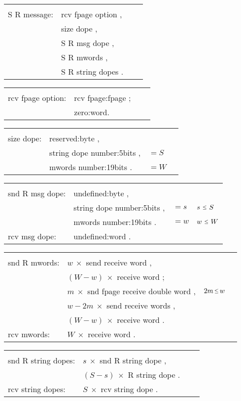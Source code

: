 \documentclass[a4paper,11pt,twoside,dvips]{book}
\newcommand{\smaller}[1]{{\mathchoice 
           {\raisebox{1pt}{$\scriptstyle #1$}} 
           {\raisebox{1pt}{$\scriptstyle #1$}} 
           {\raisebox{0.5pt}{$\scriptscriptstyle #1$}} 
           {\raisebox{0.5pt}{$\scriptscriptstyle #1$}} 
}}
\newcommand{\LE}{\smaller{\le}}
\newlength{\Up}\setlength{\Up}{-\baselineskip}
\newenvironment{vwg}{\par\vspace{10pt}%
\noindent\begin{tabular}{llll}\hspace*{80pt}&\hspace*{200pt}\\[\Up]} 
{\end{tabular}\par\vspace{10pt}}
\begin{document}
\begin{vwg} 
S R message: & rcv fpage option ,\\ 
             & size dope ,\\ 
             & S R msg dope ,\\ 
             & S R mwords ,\\ 
             & S R string dopes . 
\end{vwg} 
 
 
\begin{vwg} 
rcv fpage option: & rcv fpage:fpage ;\\ 
                  & zero:word. 
\end{vwg} 
 
 
 
\begin{vwg} 
size dope: & reserved:byte ,              \\ 
           & string dope number:5bits ,   & $= S$ &\\ 
           & mwords number:19bits .       & $= W$ & 
\end{vwg} 
 
\begin{vwg} 
snd R msg  dope: & undefined:byte ,         \\ 
                 & string dope number:5bits ,& $= s$ &  $s\ \LE\ S$ \\ 
                 & mwords number:19bits .    & $= w$ &  $w\ \LE\ W$ \\[8pt] 
% 
rcv msg  dope: & undefined:word .         \\ 
\end{vwg} 
 
\begin{vwg} 
snd R mwords:  & $w\ \times$ send receive word ,  \\ 
               & $(W-w)\ \times$ receive word ;       \\[5pt] 
% 
               & $m\ \times$ snd fpage receive double word , & $2m\,\LE\,w$\\ 
               & $w-2m\ \times$ send receive words ,  \\ 
               & $(W-w)\ \times$ receive word .       \\[8pt] 
% 
rcv mwords:    & $W\ \times$ receive word . 
\end{vwg} 
 
\begin{vwg} 
snd R string dopes: & $s\ \times$ snd R string dope ,  \\ 
                    & $(S-s)\ \times$ R string dope .  \\[8pt] 
% 
rcv string dopes:   & $S\ \times$ rcv string dope . 
\end{vwg} 
 
\end{document}
